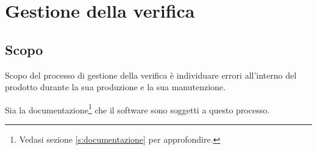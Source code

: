 \section{Gestione della verifica}\label{s:verifica}
\subsection{Scopo}

Scopo del processo di gestione della verifica è individuare errori all'interno del prodotto durante la sua produzione e la sua manutenzione.

Sia la documentazione\footnote{Vedasi sezione \ref{s:documentazione} per approfondire.} che il software sono soggetti a questo processo.
